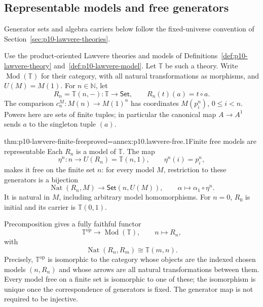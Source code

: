 
\subsection{Representable models and free generators}
\label{sec:p10-lawvere-free-algebras}

Generator sets and algebra carriers below follow the fixed-universe
convention of Section~\ref{sec:p10-lawvere-theories}.

Use the product-oriented Lawvere theories and models of
Definitions~\ref{def:p10-lawvere-theory} and~\ref{def:p10-lawvere-model}.
Let \(\mathbb T\) be such a theory.
Write \(\operatorname{Mod}(\mathbb T)\) for their category, with all
natural transformations as morphisms, and \(U(M)=M(1)\).
For \(n\in\mathbb N\), let
\[
 R_n=\mathbb T(n,-):\mathbb T\longrightarrow\mathsf{Set},\qquad
 R_n(t)(a)=t\circ a.
\]
The comparison \(c_n^M:M(n)\to M(1)^n\) has coordinates
\(M(p_i^n)\), \(0\leq i<n\).
Powers here are sets of finite tuples; in particular the canonical
map \(A\to A^1\) sends \(a\) to the singleton tuple \((a)\).

\begin{hbtheorem}{thm:p10-lawvere-finite-free}{proved=annex:p10.lawvere-free.1}{Finite free models are representable}
Each \(R_n\) is a model of \(\mathbb T\).
The map
\[
 \eta^n:n\longrightarrow U(R_n)=\mathbb T(n,1),
 \qquad \eta^n(i)=p_i^n,
\]
makes it free on the finite set \(n\): for every model \(M\),
restriction to these generators is a bijection
\[
 \operatorname{Nat}(R_n,M)\longrightarrow\mathsf{Set}(n,U(M)),
 \qquad \alpha\longmapsto\alpha_1\circ\eta^n.
\]
It is natural in \(M\), including arbitrary model homomorphisms.
For \(n=0\), \(R_0\) is initial and its carrier is \(\mathbb T(0,1)\).

Precomposition gives a fully faithful functor
\[
 \mathbb T^{\mathrm{op}}\longrightarrow\operatorname{Mod}(\mathbb T),
 \qquad n\longmapsto R_n,
\]
with
\[
 \operatorname{Nat}(R_n,R_m)\cong\mathbb T(m,n).
\]
Precisely, \(\mathbb T^{\mathrm{op}}\) is isomorphic to the category
whose objects are the indexed chosen models \((n,R_n)\) and whose
arrows are all natural transformations between them.
Every model free on a finite set is isomorphic to one of these;
the isomorphism is unique once the correspondence of generators is fixed.
The generator map is not required to be injective.
\end{hbtheorem}

